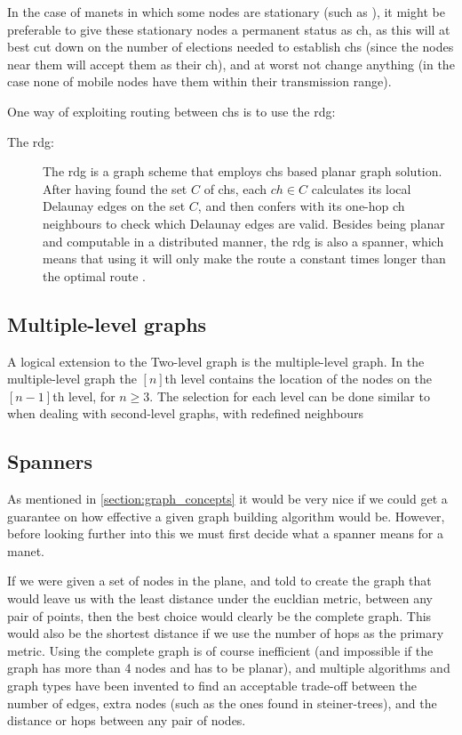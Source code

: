 In the case of \acp{manet} in which some nodes are stationary (such as \cite{two-tier}), it might be preferable to give these stationary nodes a permanent status as \ac{ch}, as this will at best cut down on the number of elections needed to establish \acp{ch} (since the nodes near them will accept them as their \ac{ch}), and at worst not change anything (in the case none of mobile nodes have them within their transmission range).

One way of exploiting routing between \acp{ch} is to use the \ac{rdg}:
\begin{description}
\item[The \ac{rdg}:] The \ac{rdg} is a graph scheme that employs \acp{ch} based planar graph solution. After having found the set $C$ of \acp{ch}, each $ch \in C$ calculates its local Delaunay edges on the set $C$, and then confers with its one-hop \ac{ch} neighbours to check which Delaunay edges are valid. Besides being planar and computable in a distributed manner, the \ac{rdg} is also a spanner, which means that using it will only make the route a constant times longer than the optimal route \cite{GeoSpanners}.
\end{description}

\subsection{Multiple-level graphs}
A logical extension to the Two-level graph is the multiple-level graph. In the multiple-level graph the $[n]$th level contains the location of the nodes on the $[n-1]$th level, for $n \geq 3$. The selection for each level can be done similar to when dealing with second-level graphs, with redefined neighbours    

\subsection{Spanners}
\label{section:spanners}
As mentioned in \ref{section:graph_concepts} it would be very nice if we could get a guarantee on how effective a given graph building algorithm would be. However, before looking further into this we must first decide what a spanner means for a \ac{manet}.

If we were given a set of nodes in the plane, and told to create the graph that would leave us with the least distance under the eucldian metric, between any pair of points, then the best choice would clearly be the complete graph. This would also be the shortest distance if we use the number of hops as the primary metric. Using the complete graph is of course inefficient (and impossible if the graph has more than 4 nodes and has to be planar), and multiple algorithms and graph types have been invented to find an acceptable trade-off between the number of edges, extra nodes (such as the ones found in steiner-trees), and the distance or hops between any pair of nodes.

